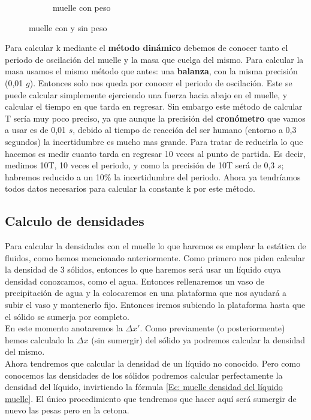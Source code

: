 \documentclass[12pt,a4paper]{book}
\begin{document}
\begin{figure}[h!]
\begin{subfigure}[b]{0.3\linewidth}
\caption{muelle con peso}
\label{fig: muelle con peso}
\end{subfigure}
\label{fig: muelle figura}
\caption{muelle con y sin peso}
\end{figure}

Para calcular k mediante el \textbf{método dinámico} debemos de conocer tanto el periodo de oscilación del muelle y la masa que cuelga del mismo. Para calcular la masa usamos el mismo método que antes: una \textbf{balanza}, con la misma precisión (0,01 $g$). Entonces solo nos queda por conocer el periodo de oscilación. Este se puede calcular simplemente ejerciendo una fuerza hacia abajo en el muelle, y calcular el tiempo en que tarda en regresar. Sin embargo este método de calcular T sería muy poco preciso, ya que aunque la precisión del \textbf{cronómetro} que vamos a usar es de 0,01 $s$, debido al tiempo de reacción del ser humano (entorno a 0,3 segundos) la incertidumbre es mucho mas grande. Para tratar de reducirla  lo que hacemos es medir cuanto tarda en regresar 10 veces al punto de partida. Es decir, medimos 10T, 10 veces el periodo, y como la precisión de 10T será de 0,3 $s$; habremos reducido a un 10\% la incertidumbre del periodo. Ahora ya tendríamos todos datos necesarios para calcular la constante k por este método.

\subsection{Calculo de densidades}

Para calcular la densidades con el muelle lo que haremos es emplear la estática de fluidos, como hemos mencionado anteriormente. Como primero nos piden calcular la densidad de 3 sólidos, entonces lo que haremos será usar un líquido cuya densidad conozcamos, como el agua. Entonces rellenaremos un vaso de precipitación de agua y la colocaremos en una plataforma que nos ayudará a subir el vaso y mantenerlo fijo. Entonces iremos subiendo la plataforma hasta que el sólido se sumerja por completo.\\

En este momento anotaremos la $\Delta x'$. Como previamente (o posteriormente) hemos calculado la $\Delta x$ (sin sumergir) del sólido ya podremos calcular la densidad del mismo. \\

Ahora tendremos que calcular la densidad de un líquido no conocido. Pero como conocemos las densidades de los sólidos podremos calcular perfectamente la densidad del líquido, invirtiendo la fórmula \ref{Ec: muelle densidad del líquido muelle}. El único procedimiento que tendremos que hacer aquí será sumergir de nuevo las pesas pero en la cetona.
\end{document}
